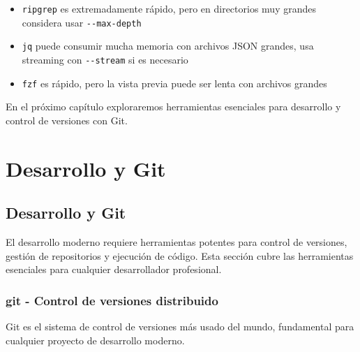 \documentclass[
  11pt,
  letterpaper,
  oneside,
  openany]{scrbook}
\providecommand{\tightlist}{%
  \setlength{\itemsep}{0pt}\setlength{\parskip}{0pt}}
\begin{document}
\begin{tcolorbox}[enhanced jigsaw, toprule=.15mm, bottomrule=.15mm, opacityback=0, coltitle=black, rightrule=.15mm, colframe=quarto-callout-important-color-frame, titlerule=0mm, opacitybacktitle=0.6, left=2mm, colback=white, bottomtitle=1mm, arc=.35mm, leftrule=.75mm, title=\textcolor{quarto-callout-important-color}{\faExclamation}\hspace{0.5em}{Rendimiento}, colbacktitle=quarto-callout-important-color!10!white, breakable, toptitle=1mm]

\begin{itemize}
\tightlist
\item
  \texttt{ripgrep} es extremadamente rápido, pero en directorios muy
  grandes considera usar \texttt{-\/-max-depth}
\item
  \texttt{jq} puede consumir mucha memoria con archivos JSON grandes,
  usa streaming con \texttt{-\/-stream} si es necesario
\item
  \texttt{fzf} es rápido, pero la vista previa puede ser lenta con
  archivos grandes
\end{itemize}

\end{tcolorbox}

En el próximo capítulo exploraremos herramientas esenciales para
desarrollo y control de versiones con Git.

\part{Desarrollo y Git}

\chapter{Desarrollo y Git}\label{desarrollo-y-git-2}

El desarrollo moderno requiere herramientas potentes para control de
versiones, gestión de repositorios y ejecución de código. Esta sección
cubre las herramientas esenciales para cualquier desarrollador
profesional.

\section{git - Control de versiones distribuido}\label{sec-git}

Git es el sistema de control de versiones más usado del mundo,
fundamental para cualquier proyecto de desarrollo moderno.
\end{document}
